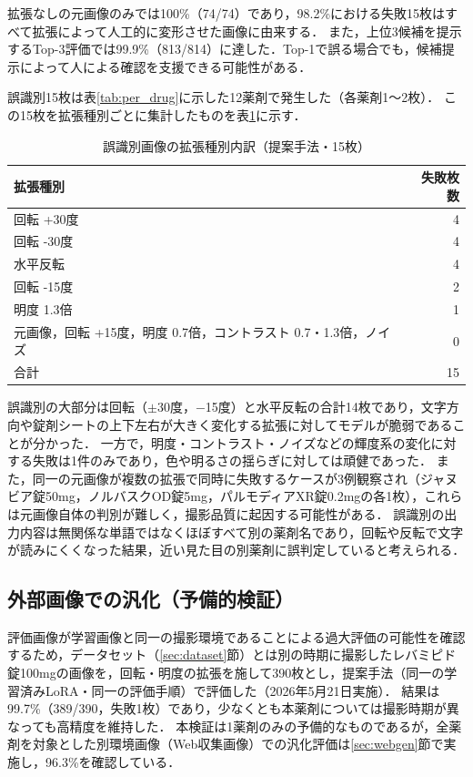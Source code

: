\documentclass[dvipdfmx]{jsarticle}
\begin{document}
拡張なしの元画像のみでは100\%（74/74）であり，98.2\%における失敗15枚はすべて拡張によって人工的に変形させた画像に由来する．
また，上位3候補を提示するTop-3評価では99.9\%（813/814）に達した．Top-1で誤る場合でも，候補提示によって人による確認を支援できる可能性がある．

誤識別15枚は表\ref{tab:per_drug}に示した12薬剤で発生した（各薬剤1〜2枚）．
この15枚を拡張種別ごとに集計したものを表\ref{tab:failed_aug}に示す．

\begin{table}[htbp]
\centering
\caption{誤識別画像の拡張種別内訳（提案手法・15枚）}
\label{tab:failed_aug}
\begin{tabular}{lr}
\hline
拡張種別 & 失敗枚数 \\
\hline
回転 +30度 & 4 \\
回転 -30度 & 4 \\
水平反転 & 4 \\
回転 -15度 & 2 \\
明度 1.3倍 & 1 \\
元画像，回転 +15度，明度 0.7倍，コントラスト 0.7・1.3倍，ノイズ & 0 \\
\hline
合計 & 15 \\
\hline
\end{tabular}
\end{table}

誤識別の大部分は回転（$\pm$30度，$-$15度）と水平反転の合計14枚であり，文字方向や錠剤シートの上下左右が大きく変化する拡張に対してモデルが脆弱であることが分かった．
一方で，明度・コントラスト・ノイズなどの輝度系の変化に対する失敗は1件のみであり，色や明るさの揺らぎに対しては頑健であった．
また，同一の元画像が複数の拡張で同時に失敗するケースが3例観察され（ジャヌビア錠50mg，ノルバスクOD錠5mg，パルモディアXR錠0.2mgの各1枚），これらは元画像自体の判別が難しく，撮影品質に起因する可能性がある．
誤識別の出力内容は無関係な単語ではなくほぼすべて別の薬剤名であり，回転や反転で文字が読みにくくなった結果，近い見た目の別薬剤に誤判定していると考えられる．

\subsection{外部画像での汎化（予備的検証）}\label{sec:ext}

評価画像が学習画像と同一の撮影環境であることによる過大評価の可能性を確認するため，データセット（\ref{sec:dataset}節）とは別の時期に撮影したレバミピド錠100mgの画像を，回転・明度の拡張を施して390枚とし，提案手法（同一の学習済みLoRA・同一の評価手順）で評価した（2026年5月21日実施）．
結果は99.7\%（389/390，失敗1枚）であり，少なくとも本薬剤については撮影時期が異なっても高精度を維持した．
本検証は1薬剤のみの予備的なものであるが，全薬剤を対象とした別環境画像（Web収集画像）での汎化評価は\ref{sec:webgen}節で実施し，96.3\%を確認している．
\end{document}
